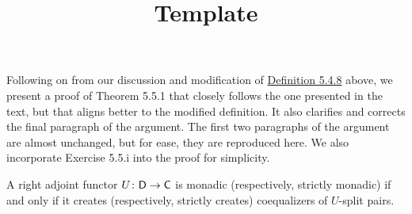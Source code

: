 \documentclass[../../solutions]{subfiles}
\title{Template}
\author{}
\begin{document}
\maketitle

%
\label{thm:5.5.1}
Following on from our discussion and modification of
\hyperref[def:5.4.8]{Definition 5.4.8} above, we present a proof of
Theorem 5.5.1 that closely follows the one presented in the text, but
that aligns better to the modified definition.  It also clarifies and
corrects the final paragraph of the argument.  The first two
paragraphs of the argument are almost unchanged, but for ease, they
are reproduced here.  We also incorporate Exercise 5.5.i into the
proof for simplicity.

\begin{theorem}
  A right adjoint functor ${U}\colon{{\mathsf{D}}}\to{{\mathsf{C}}}$ is monadic
  (respectively, strictly monadic) if and only if it creates
  (respectively, strictly creates) coequalizers of $U$-split pairs.
\end{theorem}
\end{document}
